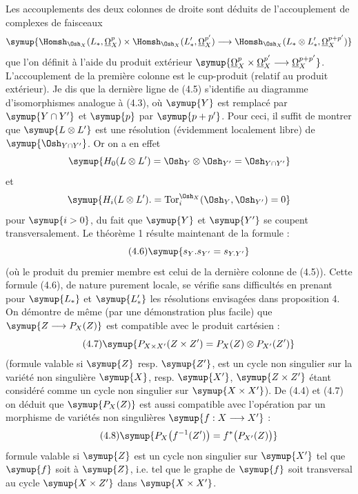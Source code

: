 Les accouplements des deux colonnes de droite sont déduits de l'accouplement de
complexes de faisceaux
\[
\symup{\Homsh_{\Osh_X}(L_{*},\underline{\Omega}_X^{p})
\times\Homsh_{\Osh_X}(L'_{*},\underline{\Omega}_X^{p'})
\longrightarrow
\Homsh_{\Osh_X}(L_{*}\otimes L'_{*},\underline{\Omega}_X^{p+p'})}
\]
que l'on définit à l'aide du produit extérieur
$\symup{\underline{\Omega}_X^{p}\times\underline{\Omega}_X^{p'}\longrightarrow\underline{\Omega}_X^{p+p'}}$.
L'accouplement de la première colonne est le cup-produit (relatif au produit
extérieur). Je dis que la dernière ligne de (4.5) s'identifie au diagramme
d'isomorphismes analogue à (4.3), où $\symup{Y}$ est remplacé par $\symup{Y\cap Y'}$ et $\symup{p}$ par
$\symup{p+p'}$. Pour ceci, il suffit de montrer que $\symup{L\otimes L'}$ est une résolution
(évidemment localement libre) de $\symup{\Osh_{Y\cap Y'}}$. Or on a en effet
\[
  \symup{H_0(L\otimes L')=\Osh_Y\otimes\Osh_{Y'}=\Osh_{Y\cap Y'}}
\]
et
\[
  \symup{H_i(L\otimes L').=\operatorname{Tor}_{i}^{\Osh_X}(\Osh_Y,\Osh_{Y'})=0}
\]
pour $\symup{i>0}$, du fait que $\symup{Y}$ et $\symup{Y'}$ se coupent transversalement. Le théorème 1 résulte
maintenant de la formule :
\begin{equation}\tag{4.6}
  \symup{s_Y.s_{Y'}=s_{Y.Y'}}
\end{equation}
(où le produit du premier membre est celui de la dernière colonne de (4.5)).
Cette formule (4.6), de nature purement locale, se vérifie sans difficultés en
prenant pour $\symup{L_{*}}$ et $\symup{L'_{*}}$ les résolutions envisagées dans proposition
4. On démontre de même (par une démonstration plus facile) que
$\symup{Z\longrightarrow P_X(Z)}$ est compatible avec le produit cartésien :
\begin{equation}\tag{4.7}
  \symup{P_{X\times X'}(Z\times Z')=P_X(Z)\otimes P_{X'}(Z')}
\end{equation}
(formule valable si $\symup{Z}$ resp. $\symup{Z'}$, est un cycle non singulier sur la variété
non singulière $\symup{X}$, resp. $\symup{X'}$, $\symup{Z\times Z'}$ étant considéré comme un cycle non
singulier sur $\symup{X\times X'}$). De (4.4) et (4.7) on déduit que $\symup{P_X(Z)}$ est aussi
compatible avec l'opération  par un morphisme de variétés non
singulières $\symup{f:X\longrightarrow X'}$ :
\begin{equation}\tag{4.8}
  \symup{P_X\bigl(f^{-1}(Z')\bigr)=f^{*}\bigl(P_{X'}(Z)\bigr)}
\end{equation}
formule valable si $\symup{Z}$ est un cycle non singulier sur $\symup{X'}$ tel que $\symup{f}$ soit
 à $\symup{Z}$, i.e. tel que le graphe de $\symup{f}$ soit transversal au cycle
$\symup{X\times Z'}$ dans $\symup{X\times X'}$.

